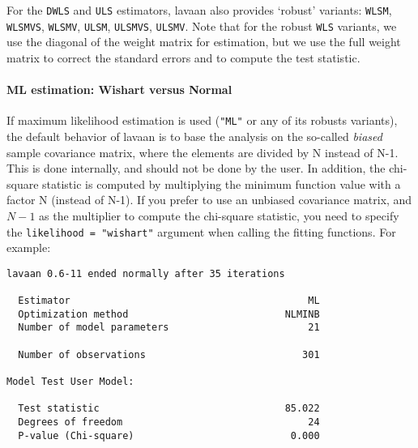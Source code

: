 For the \texttt{DWLS} and \texttt{ULS} estimators, lavaan also provides
`robust' variants: \texttt{WLSM}, \texttt{WLSMVS}, \texttt{WLSMV},
\texttt{ULSM}, \texttt{ULSMVS}, \texttt{ULSMV}. Note that for the robust
\texttt{WLS} variants, we use the diagonal of the weight matrix for
estimation, but we use the full weight matrix to correct the standard
errors and to compute the test statistic.

\hypertarget{ml-estimation-wishart-versus-normal}{%
\paragraph{ML estimation: Wishart versus
Normal}\label{ml-estimation-wishart-versus-normal}}

If maximum likelihood estimation is used (\texttt{"ML"} or any of its
robusts variants), the default behavior of lavaan is to base the
analysis on the so-called \emph{biased} sample covariance matrix, where
the elements are divided by N instead of N-1. This is done internally,
and should not be done by the user. In addition, the chi-square
statistic is computed by multiplying the minimum function value with a
factor N (instead of N-1). If you prefer to use an unbiased covariance
matrix, and \(N-1\) as the multiplier to compute the chi-square
statistic, you need to specify the \texttt{likelihood\ =\ "wishart"}
argument when calling the fitting functions. For example:

\begin{Shaded}
\begin{Highlighting}[]
\OtherTok{\textless{}{-}} 
            \NormalTok{)}
\end{Highlighting}
\end{Shaded}

\begin{verbatim}
lavaan 0.6-11 ended normally after 35 iterations

  Estimator                                         ML
  Optimization method                           NLMINB
  Number of model parameters                        21
                                                      
  Number of observations                           301
                                                      
Model Test User Model:
                                                      
  Test statistic                                85.022
  Degrees of freedom                                24
  P-value (Chi-square)                           0.000
\end{verbatim}

